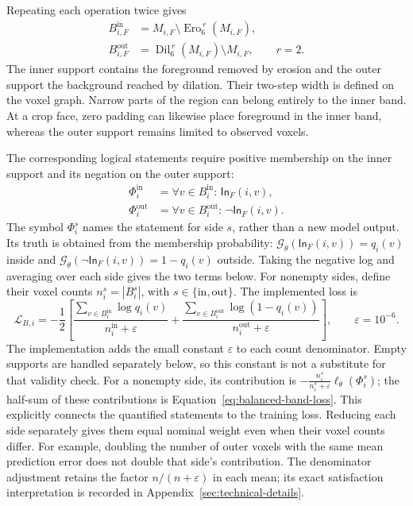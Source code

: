 \documentclass[12pt,a4paper]{article}
\begin{document}
Repeating each operation twice gives
\begin{equation}
\begin{aligned}
B_{i,F}^{\mathrm{in}}
 &=M_{i,F}\setminus\operatorname{Ero}_6^{\,r}(M_{i,F}),\\
B_{i,F}^{\mathrm{out}}
 &=\operatorname{Dil}_6^{\,r}(M_{i,F})\setminus M_{i,F},
\qquad r=2.
\end{aligned}
\label{eq:reference-boundary-bands}
\end{equation}
The inner support contains the foreground removed by erosion and the
outer support the background reached by dilation. Their two-step width
is defined on the voxel graph. Narrow parts of the region can belong
entirely to the inner band. At a crop face, zero padding can likewise
place foreground in the inner band, whereas the outer support remains
limited to observed voxels.

The corresponding logical statements require positive membership on
the inner support and its negation on the outer support:
\begin{equation}
\begin{aligned}
\Phi_i^{\mathrm{in}}
 &=\forall v\in B_i^{\mathrm{in}}:\,\mathsf{In}_{F}(i,v),\\
\Phi_i^{\mathrm{out}}
 &=\forall v\in B_i^{\mathrm{out}}:\,\lnot\mathsf{In}_{F}(i,v).
\end{aligned}
\label{eq:band-logical-statements}
\end{equation}
The symbol $\Phi_i^s$ names the statement for side $s$, rather than a
new model output. Its truth is obtained from the membership probability:
$\mathcal G_\theta(\mathsf{In}_F(i,v))=q_i(v)$ inside and
$\mathcal G_\theta(\lnot\mathsf{In}_F(i,v))=1-q_i(v)$ outside.
Taking the negative log and averaging over each side gives the two terms
below. For nonempty sides, define their voxel counts
$n_i^s=|B_i^s|$, with $s\in\{\mathrm{in},\mathrm{out}\}$. The implemented loss is
\begin{equation}
\mathcal L_{B,i}=-\frac12\left[
\frac{\sum_{v\in B_i^{\mathrm{in}}}\log q_i(v)}{n_i^{\mathrm{in}}+\varepsilon}
+\frac{\sum_{v\in B_i^{\mathrm{out}}}\log(1-q_i(v))}{n_i^{\mathrm{out}}+\varepsilon}
\right],\qquad \varepsilon=10^{-6}.
\label{eq:balanced-band-loss}
\end{equation}
The implementation adds the small constant $\varepsilon$ to each
count denominator. Empty supports are handled separately below, so this
constant is not a substitute for that validity check. For a
nonempty side, its contribution is
$-\frac{n_i^s}{n_i^s+\varepsilon}\ell_\theta(\Phi_i^s)$;
the half-sum of these contributions is Equation~\ref{eq:balanced-band-loss}.
This explicitly connects the quantified statements to the training loss.
Reducing each side separately gives them equal nominal weight even when
their voxel counts differ. For example, doubling the number of outer
voxels with the same mean prediction error does not double that side's
contribution. The denominator adjustment retains the factor
$n/(n+\varepsilon)$ in each mean; its exact satisfaction interpretation
is recorded in Appendix~\ref{sec:technical-details}.
\end{document}
